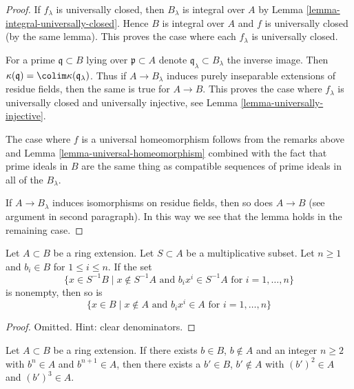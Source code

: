 \begin{proof}
If $f_\lambda$ is universally closed, then
$B_\lambda$ is integral over $A$ by
Lemma \ref{lemma-integral-universally-closed}.
Hence $B$ is integral over $A$ and $f$
is universally closed (by the same lemma).
This proves the case where each $f_\lambda$ is universally closed.

\medskip\noindent
For a prime $\mathfrak q \subset B$ lying over $\mathfrak p \subset A$
denote $\mathfrak q_\lambda \subset B_\lambda$ the inverse image.
Then $\kappa(\mathfrak q) = \colim \kappa(\mathfrak q_\lambda)$.
Thus if $A \to B_\lambda$ induces purely inseparable extensions
of residue fields, then the same is true for $A \to B$. This proves the case
where $f_\lambda$ is universally closed and universally injective, see
Lemma \ref{lemma-universally-injective}.

\medskip\noindent
The case where $f$ is a universal homeomorphism follows from
the remarks above and Lemma \ref{lemma-universal-homeomorphism}
combined with the fact that prime ideals in $B$ are the same thing
as compatible sequences of prime ideals in all of the $B_\lambda$.

\medskip\noindent
If $A \to B_\lambda$ induces isomorphisms on residue fields, then
so does $A \to B$ (see argument in second paragraph).
In this way we see that the lemma holds in the remaining case.
\end{proof}

\begin{lemma}
\label{lemma-special-elements-and-localization}
Let $A \subset B$ be a ring extension. Let $S \subset A$ be a
multiplicative subset. Let $n \geq 1$ and
$b_i \in B$ for $1 \leq i \leq n$. If the set
$$
\{x \in S^{-1}B \mid
x \not \in S^{-1}A\text{ and } b_i x^i \in S^{-1}A\text{ for }i = 1, \ldots, n\}
$$
is nonempty, then so is
$$
\{x \in B \mid
x \not \in A\text{ and } b_i x^i \in A\text{ for }i = 1, \ldots, n\}
$$
\end{lemma}

\begin{proof}
Omitted. Hint: clear denominators.
\end{proof}

\begin{lemma}
\label{lemma-nth-and-nplusone-implies-square-and-cube}
Let $A \subset B$ be a ring extension. If there exists
$b \in B$, $b \not \in A$ and an integer $n \geq 2$ with
$b^n \in A$ and $b^{n + 1} \in A$, then there exists a
$b' \in B$, $b' \not \in A$
with $(b')^2 \in A$ and $(b')^3 \in A$.
\end{lemma}

